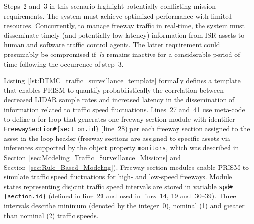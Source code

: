 \noindent Steps~2 and~3 in this scenario highlight potentially conflicting mission requirements. The system must achieve optimized performance with limited resources. Concurrently, to manage freeway traffic in real-time, the system must disseminate timely (and potentially low-latency) information from ISR assets to human and software traffic control agents. The latter requirement could presumably be compromised if~\emph{la} remains inactive for a considerable period of time following the occurrence of step~3.

Listing~\ref{lst:DTMC_traffic_surveillance_template} formally defines a template that enables PRISM to quantify probabilistically the correlation between decreased LIDAR sample rates and increased latency in the dissemination of information related to traffic speed fluctuations. Lines~27 and~41 use meta-code to define a for loop that generates one freeway section module with identifier \texttt{FreewaySection\#\{section.id\}} (line~28) per each freeway section assigned to the asset in the loop header (freeway sections are assigned to specific assets via inferences supported by the object property \texttt{monitors}, which was described in Section~\ref{sec:Modeling_Traffic_Surveillance_Missions} and Section~\ref{sec:Rule_Based_Modeling}). Freeway section modules enable PRISM to simulate traffic speed fluctuations for high- and low-speed freeways. Module states representing disjoint traffic speed intervals are stored in variable \texttt{spd\#\{section.id\}} (defined in line~29 and used in lines~14, 19 and~30--39). Three intervals describe minimum (denoted by the integer~0), nominal (1) and greater than nominal (2) traffic speeds.

